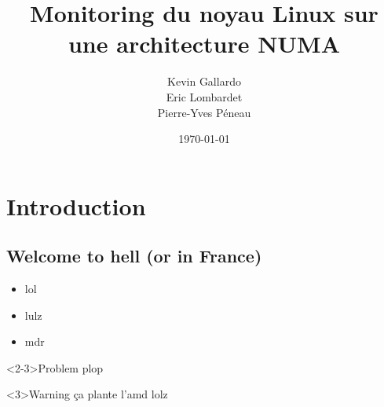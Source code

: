 \documentclass{beamer}
\title{Monitoring du noyau Linux sur une architecture NUMA}
\author[]{Kevin Gallardo\\Eric Lombardet\\Pierre-Yves Péneau}
\date{\today} \institute[UPMC]{Pierre and Marie Curie College}
\newcommand{\bframe}{\begin{frame}{\secname}{\subsecname}}
\begin{document}
  \frame{\titlepage}

  \section{Introduction}
    \subsection{Welcome to hell (or in France)}

      \bframe

        \begin{itemize}
          \item lol
          \item lulz
          \item mdr
        \end{itemize}
        \begin{block}<2-3>{Problem}
          plop
        \end{block}
        \begin{alertblock}<3>{Warning}
          ça plante l'amd lolz
        \end{alertblock}

      \end{frame}
\end{document}

